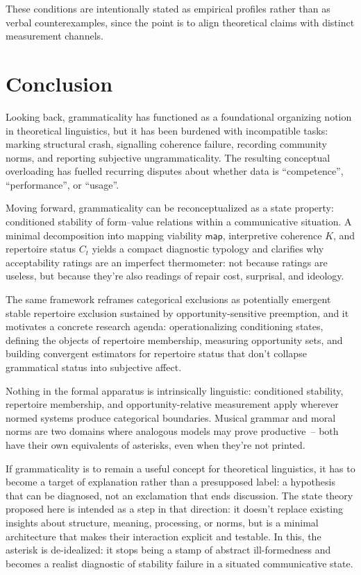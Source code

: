 \documentclass[12pt,letterpaper]{article}
\begin{document}
\begin{sloppypar}
These conditions are intentionally stated as empirical profiles rather than as verbal counterexamples, since the point is to align theoretical claims with distinct measurement channels.
\end{sloppypar}

\section{Conclusion}

Looking back, grammaticality has functioned as a foundational organizing notion in theoretical linguistics, but it has been burdened with incompatible tasks: marking structural crash, signalling coherence failure, recording community norms, and reporting subjective ungrammaticality. The resulting conceptual overloading has fuelled recurring disputes about whether data is \enquote{competence}, \enquote{performance}, or \enquote{usage}.

Moving forward, grammaticality can be reconceptualized as a state property: conditioned stability of form--value relations within a communicative situation. A minimal decomposition into mapping viability $\mathsf{map}$, interpretive coherence $K$, and repertoire status $C_t$ yields a compact diagnostic typology and clarifies why acceptability ratings are an imperfect thermometer: not because ratings are useless, but because they're also readings of repair cost, surprisal, and ideology. \begin{sloppypar}
The same framework reframes categorical exclusions as potentially emergent stable repertoire exclusion sustained by opportunity-sensitive preemption, and it motivates a concrete research agenda: operationalizing conditioning states, defining the objects of repertoire membership, measuring opportunity sets, and building convergent estimators for repertoire status that don't collapse grammatical status into subjective affect.
\end{sloppypar}

Nothing in the formal apparatus is intrinsically linguistic: conditioned stability, repertoire membership, and opportunity-relative measurement apply wherever normed systems produce categorical boundaries. Musical grammar and moral norms are two domains where analogous models may prove productive~-- both have their own equivalents of asterisks, even when they're not printed.

If grammaticality is to remain a useful concept for theoretical linguistics, it has to become a target of explanation rather than a presupposed label: a hypothesis that can be diagnosed, not an exclamation that ends discussion. The state theory proposed here is intended as a step in that direction: it doesn't replace existing insights about structure, meaning, processing, or norms, but is a minimal architecture that makes their interaction explicit and testable. In this, the asterisk is de-idealized: it stops being a stamp of abstract ill-formedness and becomes a realist diagnostic of stability failure in a situated communicative state.
\end{document}
